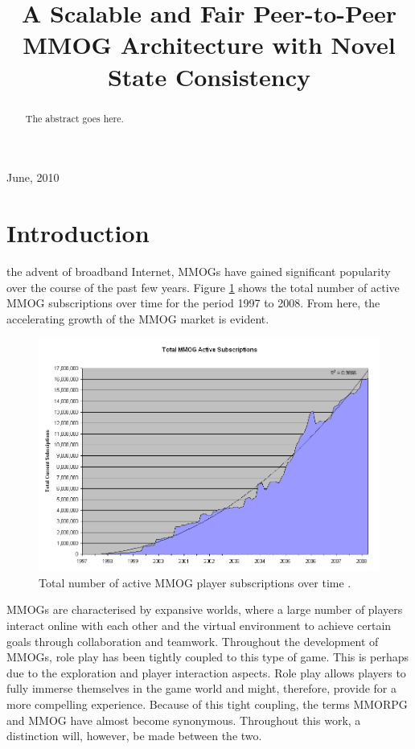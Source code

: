 \documentclass[journal,oneside,a4paper,onecolumn]{IEEEtran}
\begin{document}
%
\title{A Scalable and Fair Peer-to-Peer MMOG Architecture with Novel State Consistency}

\author{
}

\maketitle

\begin{abstract}
The abstract goes here.
\end{abstract}

\hfill June, 2010

\section{Introduction}


 the advent of broadband Internet, \acp{MMOG} have gained significant popularity over the course of the past few years.
Figure \ref{fig_mmog_subscriptions} shows the total number of active MMOG subscriptions over time for the period 1997 to 2008. From here, the accelerating growth of the MMOG market is evident.
%
\begin{figure}[htbp]
 \centering
 \includegraphics[width=0.7\columnwidth]{MMOG_subscriptions}
 \caption{Total number of active MMOG player subscriptions over time \cite{mmo_growth_chart}.}
 \label{fig_mmog_subscriptions}
\end{figure}

\acp{MMOG} are characterised by expansive worlds, where a large number of players interact online with each other and the virtual environment to achieve certain goals through collaboration and teamwork. Throughout the development of \acp{MMOG}, role play has been tightly coupled to this type of game. This is perhaps due to the exploration and player interaction aspects. Role play allows players to fully immerse themselves in the game world and might, therefore, provide for a more compelling experience. Because of this tight coupling, the terms \ac{MMORPG} and \ac{MMOG} have almost become synonymous. Throughout this work, a distinction will, however, be made between the two.
\end{document}
